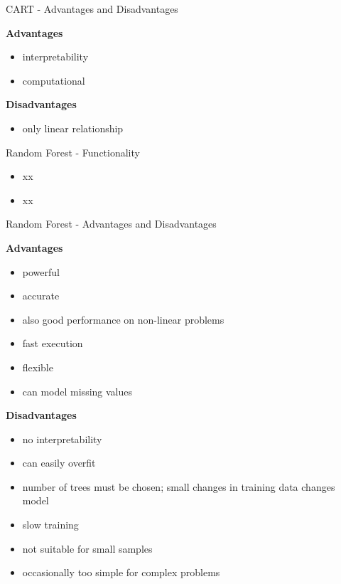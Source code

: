 \documentclass[11pt,compress,t,notes=noshow, xcolor=table]{beamer}
\begin{document}
\begin{frame}{CART - Advantages and Disadvantages}

\textbf{Advantages}
\begin{itemize}
\item interpretability
\item computational 
\end{itemize}


\textbf{Disadvantages}
\begin{itemize}
\item only linear relationship
\end{itemize}
\end{frame}



\begin{frame}{Random Forest - Functionality}

\begin{itemize}
\item xx
\item xx
\end{itemize}


\end{frame}

\begin{frame}{Random Forest - Advantages and Disadvantages}

\textbf{Advantages}
\begin{itemize}
\item powerful
\item accurate
\item also good performance on non-linear problems
\item fast execution
\item flexible 
\item can model missing values
\end{itemize}


\textbf{Disadvantages}
\begin{itemize}
\item no interpretability
\item can easily overfit
\item number of trees must be chosen; small changes in training data changes model 
\item slow training
\item not suitable for small samples
\item occasionally too simple for complex problems
\end{itemize}
\end{frame}
\end{document}
